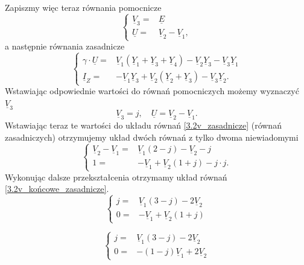 \documentclass[12pt, a4paper]{article}
\begin{document}
Zapiszmy więc teraz równania pomocnicze
\begin{equation*}
  \left\{
  \begin{array}{rl}
    \underline{V}_3 = & \underline{E}                      \\
    \underline{U} =   & \underline{V}_2 - \underline{V}_1,
  \end{array}
  \right.
\end{equation*}
a następnie równania zasadnicze
\begin{equation}\label{3.2v_zasadnicze}
  \left\{
  \begin{array}{rl}
    \gamma\cdot\underline{U} = & \underline{V}_1 \left(\underline{Y}_1+\underline{Y}_3+\underline{Y}_4\right)-\underline{V}_2\underline{Y}_3-\underline{V}_3\underline{Y}_1 \\
    \underline{I}_Z =          & - \underline{V}_1\underline{Y}_3 + \underline{V}_2\left(\underline{Y}_2+\underline{Y}_3\right) -\underline{V}_3\underline{Y}_2.
  \end{array}
  \right.
\end{equation}
Wstawiając odpowiednie wartości do równań pomocniczych możemy wyznaczyć
$\underline{V}_3$
\begin{equation*}
  \underline{V}_3 = j, \quad \underline{U} = \underline{V}_2 - \underline{V}_1.
\end{equation*}
Wstawiając teraz te wartości do układu równań \ref{3.2v_zasadnicze} (równań
zasadniczych) otrzymujemy układ dwóch równań z tylko dwoma niewiadomymi
\begin{equation*}
  \left\{
  \begin{array}{rl}
    \underline{V}_2 - \underline{V}_1 = & \underline{V}_1(2-j) - \underline{V}_2 -j           \\
    1 =                                 & - \underline{V}_1 + \underline{V}_2(1+j) -j\cdot j.
  \end{array}
  \right.
\end{equation*}
Wykonując dalsze przekształcenia otrzymamy układ równań \ref{3.2v_końcowe_zasadnicze}.
\begin{equation*}
  \left\{
  \begin{array}{rl}
    j = & \underline{V}_1 (3-j)- 2\underline{V}_2 \\
    0 = & -\underline{V}_1 + \underline{V}_2(1+j)
  \end{array}
  \right.
\end{equation*}

\begin{equation}\label{3.2v_końcowe_zasadnicze}
  \left\{
  \begin{array}{rl}
    j = & \underline{V}_1(3-j) - 2\underline{V}_2  \\
    0 = & -(1-j)\underline{V}_1 + 2\underline{V}_2
  \end{array}
  \right.
\end{equation}
\end{document}

